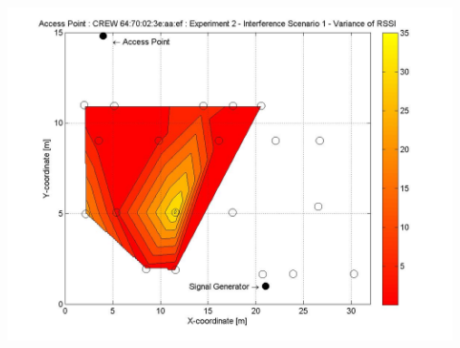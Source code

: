 \documentclass[11pt,a4paper,headinclude,footinclude,chapterprefix=on]{scrreprt}
\begin{document}
\begin{longtable}
	\includegraphics[width=13cm]{../../Source/plot/CREW_ef/ef_Sig_Ex_2_Variance.jpg} \\
\end{longtable}
\end{document}
